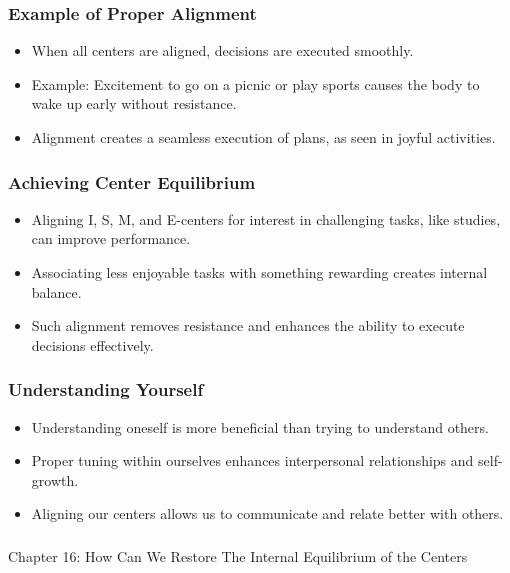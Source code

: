\begin{frame}[fragile]\frametitle{Example of Proper Alignment}
    \begin{itemize}
        \item When all centers are aligned, decisions are executed smoothly.
        \item Example: Excitement to go on a picnic or play sports causes the body to wake up early without resistance.
        \item Alignment creates a seamless execution of plans, as seen in joyful activities.
    \end{itemize}
\end{frame}

\begin{frame}[fragile]\frametitle{Achieving Center Equilibrium}
    \begin{itemize}
        \item Aligning I, S, M, and E-centers for interest in challenging tasks, like studies, can improve performance.
        \item Associating less enjoyable tasks with something rewarding creates internal balance.
        \item Such alignment removes resistance and enhances the ability to execute decisions effectively.
    \end{itemize}
\end{frame}

\begin{frame}[fragile]\frametitle{Understanding Yourself}
    \begin{itemize}
        \item Understanding oneself is more beneficial than trying to understand others.
        \item Proper tuning within ourselves enhances interpersonal relationships and self-growth.
        \item Aligning our centers allows us to communicate and relate better with others.
    \end{itemize}
\end{frame}



\begin{frame}[fragile]\frametitle{}
\begin{center}
{\Large Chapter 16: How Can We Restore The Internal Equilibrium of the Centers  }
\end{center}
\end{frame}

